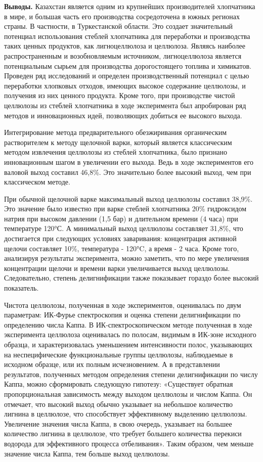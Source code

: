 \begin{multicols}{2}
{\bfseries Выводы.} Казахстан является одним из крупнейших производителей
хлопчатника в мире, и большая часть его производства сосредоточена в
южных регионах страны. В частности, в Туркестанской области. Это создает
значительный потенциал использования стеблей хлопчатника для переработки
и производства таких ценных продуктов, как лигноцеллюлоза и целлюлоза.
Являясь наиболее распространенным и возобновляемым источником,
лигноцеллюлоза является потенциальным сырьем для производства
дорогостоящего топлива и химикатов. Проведен ряд исследований и
определен производственный потенциал с целью переработки хлопковых
отходов, имеющих высокое содержание целлюлозы, и получения из них
ценного продукта. Кроме того, при производстве чистой целлюлозы из
стеблей хлопчатника в ходе эксперимента был апробирован ряд методов и
инновационных идей, позволяющих добиться ее высокого выхода.

Интегрирование метода предварительного обезжиривания органическим
растворителем к методу щелочной варки, который является классическим
методом извлечения целлюлозы из стеблей хлопчатника, было признано
инновационным шагом в увеличении его выхода. Ведь в ходе экспериментов
его валовой выход составил 46,8\%. Это значительно более высокий выход,
чем при классическом методе.

При обычной щелочной варке максимальный выход целлюлозы составил 38,9\%.
Это значение было известно при варке стеблей хлопчатника 20\%
гидроксидом натрия при высоком давлении (1,5 бар) и длительном времени
(4 часа) при температуре 120°С. А минимальный выход целлюлозы составляет
31,8\%, что достигается при следующих условиях заваривания: концентрация
активной щелочи составляет 10\%, температура - 120°C, а время - 2
часа. Кроме того, анализируя результаты эксперимента, можно заметить,
что по мере увеличения концентрации щелочи и времени варки увеличивается
выход целлюлозы. Следовательно, степень делигнификации также показывает
гораздо более высокий показатель.

Чистота целлюлозы, полученная в ходе экспериментов, оценивалась по двум
параметрам: ИК-Фурье спектроскопия и оценка степени делигнификации по
определению числа Каппа. В ИК-спектроскопическом методе полученная в
ходе эксперимента целлюлоза оценивалась по полосам, видимым в ИК-зоне
исходного образца, и характеризовалась уменьшением интенсивности полос,
указывающих на неспецифические функциональные группы целлюлозы,
наблюдаемые в исходном образце, или их полным исчезновением. А в
представлении результатов, полученных методом определения степени
делигнификации по числу Каппа, можно сформировать следующую гипотезу:
«Существует обратная пропорциональная зависимость между выходом
целлюлозы и числом Каппа. Он отмечает, что высокий выход обычно
указывает на небольшое количество лигнина в целлюлозе, что способствует
эффективному выделению целлюлозы. Увеличение значения числа Каппа, в
свою очередь, указывает на большее количество лигнина в целлюлозе, что
требует большего количества перекиси водорода для эффективного процесса
отбеливания». Таким образом, чем меньше значение числа Каппа, тем больше
выход целлюлозы.


\end{multicols}
